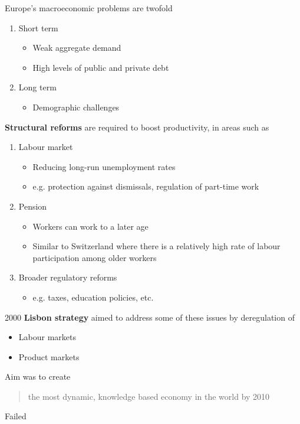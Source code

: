 \documentclass{beamer}
\begin{document}
\begin{frame}
 Europe's macroeconomic problems are twofold
  
\begin{enumerate}
  \item Short term
  \begin{itemize}
    \item Weak aggregate demand
    \item High levels of public and private debt
  \end{itemize}
  \medskip
  \item Long term
  \begin{itemize}
    \item Demographic challenges  
  \end{itemize}    
\end{enumerate}
\end{frame}

\begin{frame}
  \textbf{Structural reforms} are required to boost productivity, in areas such as
  \begin{enumerate}
  \item Labour market
  \begin{itemize}
    \item Reducing long-run unemployment rates
    \item e.g. protection against dismissals, regulation of part-time work
  \end{itemize}
  \item Pension
  \begin{itemize}
    \item Workers can work to a later age
    \item Similar to Switzerland where there is a relatively high rate of labour participation among older workers
  \end{itemize}
  \item Broader regulatory reforms
  \begin{itemize}
    \item e.g. taxes, education policies, etc. 
  \end{itemize}
\end{enumerate}
\end{frame}

\begin{frame}
  2000 \textbf{Lisbon strategy} aimed to address some of these issues by deregulation of
  \begin{itemize}
    \item Labour markets
    \item Product markets
  \end{itemize}
  \medskip
  Aim was to create
  \begin{quote}
    the most dynamic, knowledge based economy in the world by 2010  
  \end{quote}
  \medskip
  Failed  
\end{frame}
\end{document}
